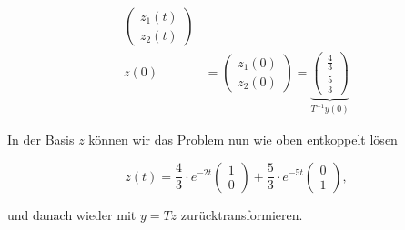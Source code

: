 \begin{equation*}
\begin{aligned}
            \begin{pmatrix}
                z_1(t) \\
                z_2(t)
            \end{pmatrix} \\[0.5em]
            z(0)&= \begin{pmatrix}
                z_1(0) \\
                z_2(0)
            \end{pmatrix} =
            \underbrace{\begin{pmatrix}
                \frac{4}{3} \\
                \frac{5}{3}
            \end{pmatrix}}_{T^{-1} y(0)}
        \end{aligned}
\end{equation*}

In der Basis \( z \) können wir das Problem nun wie oben entkoppelt lösen 

\begin{equation*}
    z(t) = \frac{4}{3} \cdot e^{-2t}
    \begin{pmatrix}
        1 \\
        0
    \end{pmatrix} + \frac{5}{3} \cdot e^{-5t}
    \begin{pmatrix}
        0 \\
        1
    \end{pmatrix} ,
\end{equation*}

und danach wieder mit \( y = Tz \) zurücktransformieren.

